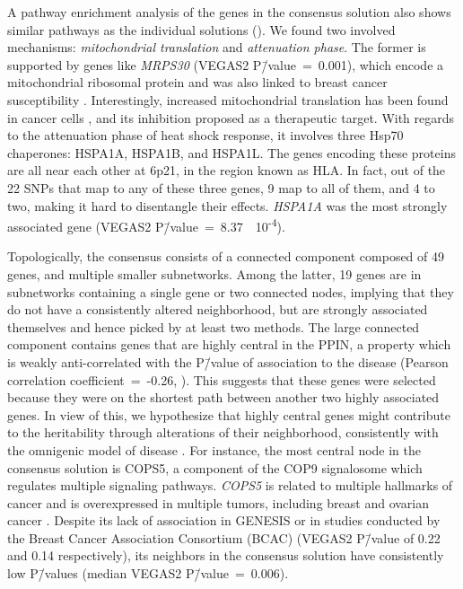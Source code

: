 \documentclass[10pt,letterpaper]{article}
\begin{document}
A pathway enrichment analysis of the genes in the consensus solution also shows similar pathways as the individual solutions (). We found two involved mechanisms: \emph{mitochondrial translation} and \emph{attenuation phase}. The former is supported by genes like \emph{MRPS30} (VEGAS2 P\=/value~=~0.001), which encode a mitochondrial ribosomal protein and was also linked to breast cancer susceptibility \cite{quigley_5p12_2014}. Interestingly, increased mitochondrial translation has been found in cancer cells \cite{Yu2016Repositioning}, and its inhibition proposed as a therapeutic target. With regards to the attenuation phase of heat shock response, it involves three Hsp70 chaperones: HSPA1A, HSPA1B, and HSPA1L. The genes encoding these proteins are all near each other at 6p21, in the region known as HLA. In fact, out of the 22 SNPs that map to any of these three genes, 9 map to all of them, and 4 to two, making it hard to disentangle their effects. \emph{HSPA1A} was the most strongly associated gene (VEGAS2 P\=/value~=~8.37~\texttimes{}~10\textsuperscript{-4}).  

Topologically, the consensus consists of a connected component composed of 49 genes, and multiple smaller subnetworks. Among the latter, 19 genes are in subnetworks containing a single gene or two connected nodes, implying that they do not have a consistently altered neighborhood, but are strongly associated themselves and hence picked by at least two methods. The large connected component contains genes that are highly central in the PPIN, a property which is weakly anti-correlated with the P\=/value of association to the disease (Pearson correlation coefficient~=~-0.26, ). This suggests that these genes were selected because they were on the shortest path between another two highly associated genes. In view of this, we hypothesize that highly central genes might contribute to the heritability through alterations of their neighborhood, consistently with the omnigenic model of disease \cite{boyle_expanded_2017}. For instance, the most central node in the consensus solution is COPS5, a component of the COP9 signalosome which regulates multiple signaling pathways. \emph{COPS5} is related to multiple hallmarks of cancer and is overexpressed in multiple tumors, including breast and ovarian cancer \cite{liu_jab1_cops5_2018}. Despite its lack of association in GENESIS or in studies conducted by the Breast Cancer Association Consortium (BCAC) \cite{Michailidou2017} (VEGAS2 P\=/value of 0.22 and 0.14 respectively), its neighbors in the consensus solution have consistently low P\=/values (median VEGAS2 P\=/value~=~0.006).
\end{document}
